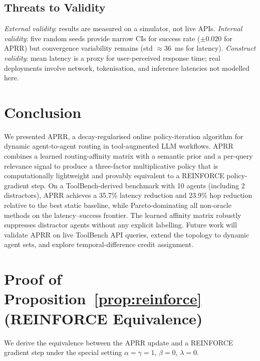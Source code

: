 \documentclass[journal,twocolumn,letterpaper]{IEEEtran}
\newcommand{\APRR}{\textsc{APRR}}
\begin{document}
\subsection{Threats to Validity}

\textit{External validity}: results are measured on a simulator, not live APIs.
\textit{Internal validity}: five random seeds provide narrow CIs for success
rate ($\pm0.020$ for \APRR{}) but convergence variability remains
(std $\approx36$~ms for latency).
\textit{Construct validity}: mean latency is a proxy for user-perceived
response time; real deployments involve network, tokenisation, and inference
latencies not modelled here.

\section{Conclusion}
\label{sec:conclusion}

We presented \APRR{}, a decay-regularised online policy-iteration algorithm
for dynamic agent-to-agent routing in tool-augmented LLM workflows.
\APRR{} combines a learned routing-affinity matrix with a semantic prior and
a per-query relevance signal to produce a three-factor multiplicative policy
that is computationally lightweight and provably equivalent to a REINFORCE
policy-gradient step.  On a ToolBench-derived benchmark with 10 agents
(including 2 distractors), \APRR{} achieves a 35.7\% latency reduction and
23.9\% hop reduction relative to the best static baseline, while
Pareto-dominating all non-oracle methods on the latency--success frontier.
The learned affinity matrix robustly suppresses distractor agents without
any explicit labelling.  Future work will validate \APRR{} on live ToolBench
API queries, extend the topology to dynamic agent sets, and explore
temporal-difference credit assignment.

\appendix

\section{Proof of Proposition~\ref{prop:reinforce} (REINFORCE Equivalence)}
\label{app:proof}

We derive the equivalence between the \APRR{} update and a REINFORCE gradient
step under the special setting $\alpha=\gamma=1$, $\beta=0$, $\lambda=0$.
\end{document}
